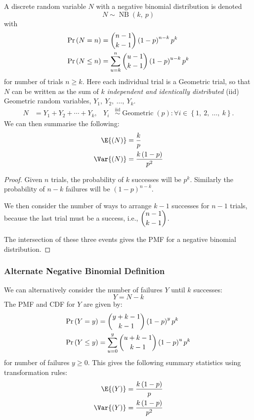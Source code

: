 \documentclass{article}
\begin{document}
A discrete random variable \(N\) with a negative binomial distribution is denoted
\begin{equation*}
    N \sim \operatorname{NB}{\left( k,\: p \right)}
\end{equation*}
with
\begin{align*}
    \Pr{\left( N = n \right)}    & = \dbinom{n - 1}{k - 1} \left( 1 - p \right)^{n - k} p^k                \\
    \Pr{\left( N \leq n \right)} & = \sum_{u = k}^n \dbinom{u - 1}{k - 1} \left( 1 - p \right)^{u - k} p^k
\end{align*}
for number of trials \(n \geq k\).
Here each individual trial is a Geometric trial, so that \(N\) can be written as the sum of
\(k\) \textit{independent and identically distributed} (iid) Geometric random variables, \(Y_1,\: Y_2,\: \dots,\: Y_k\).
\begin{align*}
    N & = Y_1 + Y_2 + \cdots + Y_k, & Y_i & \overset{\mathrm{iid}}{\sim} \operatorname{Geometric}{\left( p \right)} : \forall i \in \left\{ 1,\: 2,\: \dots,\: k \right\}.
\end{align*}
We can then summarise the following:
\begin{align*}
    \E{\left( N \right)}   & = \frac{k}{p}                        \\
    \Var{\left( N \right)} & = \frac{k \left( 1 - p \right)}{p^2}
\end{align*}
\begin{proof}
    Given \(n\) trials, the probability of \(k\) successes will be \(p^k\).
    Similarly the probability of \(n - k\) failures will be \(\left( 1 - p \right)^{n - k}\).

    We then consider the number of ways to arrange \(k - 1\) successes for \(n - 1\) trials,
    because the last trial must be a success, i.e., \(\dbinom{n - 1}{k - 1}\).

    The intersection of these three events gives the PMF for a negative binomial distribution.
\end{proof}
\subsubsection{Alternate Negative Binomial Definition}
We can alternatively consider the number of failures \(Y\) until \(k\) successes:
\begin{equation*}
    Y = N - k
\end{equation*}
The PMF and CDF for \(Y\) are given by:
\begin{align*}
    \Pr{\left( Y = y \right)}    & = \dbinom{y + k - 1}{k - 1} \left( 1 - p \right)^y p^k                \\
    \Pr{\left( Y \leq y \right)} & = \sum_{u = 0}^y \dbinom{u + k - 1}{k - 1} \left( 1 - p \right)^u p^k
\end{align*}
for number of failures \(y \geq 0\). This gives the following summary statistics using
transformation rules:
\begin{align*}
    \E{\left( Y \right)}   & = \frac{k \left( 1 - p \right)}{p}   \\
    \Var{\left( Y \right)} & = \frac{k \left( 1 - p \right)}{p^2}
\end{align*}
\end{document}
